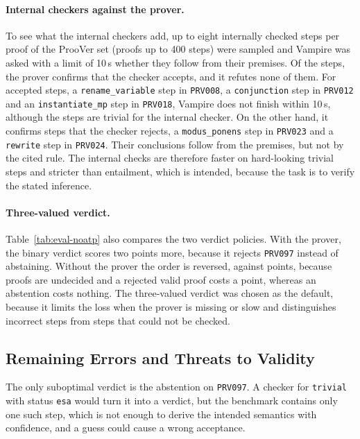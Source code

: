 \paragraph{Internal checkers against the prover.}
To see what the internal checkers add, up to eight internally checked steps per proof of the ProoVer set (proofs up to 400 steps) were sampled and Vampire was asked with a limit of 10\,s whether they follow from their premises.
Of the \EvalIntSteps{} steps, the prover confirms \EvalIntAccYes{} that the checker accepts, and it refutes none of them.
For \EvalIntUnknown{} accepted steps, a \texttt{rename\_variable} step in \texttt{PRV008}, a \texttt{conjunction} step in \texttt{PRV012} and an \texttt{instantiate\_mp} step in \texttt{PRV018}, Vampire does not finish within 10\,s, although the steps are trivial for the internal checker.
On the other hand, it confirms \EvalIntRejYes{} steps that the checker rejects, a \texttt{modus\_ponens} step in \texttt{PRV023} and a \texttt{rewrite} step in \texttt{PRV024}. Their conclusions follow from the premises, but not by the cited rule.
The internal checks are therefore faster on hard-looking trivial steps and stricter than entailment, which is intended, because the task is to verify the stated inference.

\paragraph{Three-valued verdict.}
Table~\ref{tab:eval-noatp} also compares the two verdict policies.
With the prover, the binary verdict scores two points more, because it rejects \texttt{PRV097} instead of abstaining.
Without the prover the order is reversed, \EvalNoAtpScoreTernary{} against \EvalNoAtpScoreBinary{} points, because \EvalNoAtpUncertain{} proofs are undecided and a rejected valid proof costs a point, whereas an abstention costs nothing.
The three-valued verdict was chosen as the default, because it limits the loss when the prover is missing or slow and distinguishes incorrect steps from steps that could not be checked.

\subsection{Remaining Errors and Threats to Validity}
\label{subsec:eval-errors}

The only suboptimal verdict is the abstention on \texttt{PRV097}.
A checker for \texttt{trivial} with status \texttt{esa} would turn it into a verdict, but the benchmark contains only one such step, which is not enough to derive the intended semantics with confidence, and a guess could cause a wrong acceptance.

